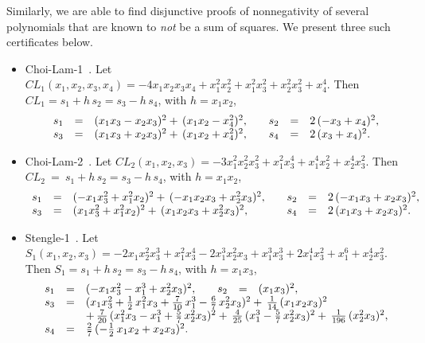 \documentclass[12pt]{article}
\theoremstyle{remark}
\begin{document}
Similarly, we are able to find disjunctive proofs of nonnegativity of several polynomials that are known to \emph{not} be a sum of squares. We present three such certificates below.
\begin{itemize}[noitemsep]
\item Choi-Lam-1~\cite{ChoiLam1976}. Let $ CL_1(x_{1},x_{2},x_{3},x_{4}) = -4x_{1} x_{2} x_{3} x_{4} + x_{1}^{2} x_{2}^{2} + x_{1}^{2} x_{3}^{2} + x_{2}^{2} x_{3}^{2} + x_{4}^{4}$.
Then $CL_1 = s_1 + h\,s_2 = s_3 - h\,s_4$, with $h = x_{1} x_{2}$,
\[
  \begin{array}{rcl@{\qquad}rcl}
    s_1 & = & (x_{1} x_{3} - x_{2} x_{3})^2 +\, (x_{1} x_{2} - x_{4}^{2})^2, & s_2 & = & 2\,(-x_{3} + x_{4})^2, \\
    s_3 & = & (x_{1} x_{3} + x_{2} x_{3})^2 +\, (x_{1} x_{2} + x_{4}^{2})^2, & s_4 & = & 2\,(x_{3} + x_{4})^2.
  \end{array}
\]
\item Choi-Lam-2~\cite{ChoiLam1977}.
Let $CL_2(x_{1},x_{2},x_{3}) = -3x_{1}^{2} x_{2}^{2} x_{3}^{2} + x_{1}^{2} x_{3}^{4} + x_{1}^{4} x_{2}^{2} + x_{2}^{4} x_{3}^{2}$. 
Then $CL_2~=~ s_1 + h\,s_2 = s_3 - h\,s_4$, with $h = x_{1} x_{2}$,
\[
  \begin{array}{rcl@{\qquad}rcl}
    s_1 & = & (-x_{1} x_{3}^{2} + x_{1}^{2} x_{2})^2 +\, (-x_{1} x_{2} x_{3} + x_{2}^{2} x_{3})^2, & s_2 & = & 2\,(-x_{1} x_{3} + x_{2} x_{3})^2, \\
    s_3 & = & (x_{1} x_{3}^{2} + x_{1}^{2} x_{2})^2 +\, (x_{1} x_{2} x_{3} + x_{2}^{2} x_{3})^2, & s_4 & = & 2\,(x_{1} x_{3} + x_{2} x_{3})^2.
  \end{array}
\]
\item Stengle-1~\cite{Stengle1979}. Let $ S_1(x_{1},x_{2},x_{3}) = -2x_{1} x_{2}^{2} x_{3}^{3} + x_{1}^{2} x_{3}^{4} - 2x_{1}^{3} x_{2}^{2} x_{3} + x_{1}^{3} x_{3}^{3} + 2x_{1}^{4} x_{3}^{2} + x_{1}^{6} + x_{2}^{4} x_{3}^{2}$.
Then $S_1 = s_1 + h\,s_2 = s_3 - h\,s_4$, with $h = x_{1} x_{3}$,
\[
  \begin{array}{rcl@{\qquad}rcl}
    s_1 & = & (-x_{1} x_{3}^{2} - x_{1}^{3} + x_{2}^{2} x_{3})^2, & s_2 & = & (x_{1} x_{3})^2, \\
    s_3 & = & \multicolumn{4}{l}{(x_{1} x_{3}^{2} + \tfrac{1}{2}\,x_{1}^{2} x_{3} + \tfrac{7}{10}\,x_{1}^{3} - \tfrac{6}{7}\,x_{2}^{2} x_{3})^2 +\, \tfrac{1}{14}\,(x_{1} x_{2} x_{3})^2} \\
     &  & \multicolumn{4}{l}{+\, \tfrac{7}{20}\,(x_{1}^{2} x_{3} - x_{1}^{3} + \tfrac{5}{7}\,x_{2}^{2} x_{3})^2 +\, \tfrac{4}{25}\,(x_{1}^{3} - \tfrac{5}{7}\,x_{2}^{2} x_{3})^2 +\, \tfrac{1}{196}\,(x_{2}^{2} x_{3})^2,} \\
    s_4 & = & \tfrac{2}{7}\,(-\tfrac{1}{2}\,x_{1} x_{2} + x_{2} x_{3})^2. & & &
  \end{array}
\]
\end{itemize}
\end{document}
